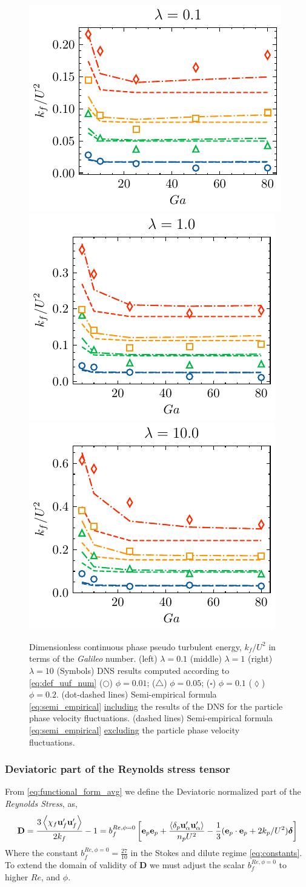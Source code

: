 \begin{figure}
    \centering
    \includegraphics[height = 0.25\textwidth]{image/HOMOGENEOUS_final/CA/KF2_l_0.pdf}
    \includegraphics[height = 0.25\textwidth]{image/HOMOGENEOUS_final/CA/KF2_l_1.pdf}
    \includegraphics[height = 0.25\textwidth]{image/HOMOGENEOUS_final/CA/KF2_l_10.pdf}
    \caption{Dimensionless continuous phase pseudo turbulent energy, $k_f/U^2$ in terms of the \textit{Galileo} number.
    (left) $\lambda = 0.1$
    (middle) $\lambda = 1$
    (right) $\lambda = 10$
    (Symbols) DNS results computed according to \ref{eq:def_uuf_num}
    ($\pmb\bigcirc$) $\phi = 0.01$; ($\pmb\triangle$) $ \phi = 0.05$; ($\pmb\square$) $\phi = 0.1$ ($\pmb\lozenge$) $\phi = 0.2$.
    (dot-dashed lines) Semi-empirical formula \ref{eq:semi_empirical} \underline{including} the results of the DNS for the particle phase velocity fluctuations. 
    (dashed lines) Semi-empirical formula \ref{eq:semi_empirical} \underline{excluding} the particle phase velocity fluctuations. 
    }
    \label{fig:kf}
\end{figure}


\subsubsection{Deviatoric part of the Reynolds stress tensor}


From \ref{eq:functional_form_avg} we define the Deviatoric normalized part of the \textit{Reynolds Stress}, as, 
\begin{equation}
    \textbf{D} =
    \frac{3\avg{\chi_f\textbf{u}_f'\textbf{u}_f'}}{2 k_f} - 1
    = 
    b_f^{Re,\phi = 0} \left[
        \textbf{e}_p\textbf{e}_p
        + \frac{\pavg{\textbf{u}_\alpha'\textbf{u}_\alpha'}}{n_p U^2}
         - \frac{1}{3}(\textbf{e}_p\cdot \textbf{e}_p+2k_p/U^2)\bm\delta
    \right]
    \label{eq:D_def}
\end{equation}
Where the constant $b_f^{Re,\phi =0} = \frac{27}{10}$ in the Stokes and dilute regime \eqref{eq:constants}. 
To extend the domain of validity of \textbf{D} we must adjust the scalar $b_f^{Re,\phi = 0}$ to higher $Re$, and $\phi$.  


